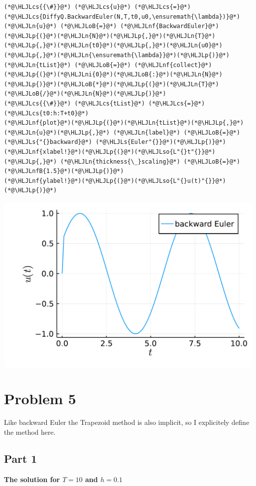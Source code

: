 \documentclass[12pt,a4paper]{article}
\newcommand{\HLJLn}[1]{#1}
\newcommand{\HLJLnf}[1]{\textcolor[RGB]{66,102,213}{#1}}
\newcommand{\HLJLs}[1]{\textcolor[RGB]{201,61,57}{#1}}
\newcommand{\HLJLso}[1]{\textcolor[RGB]{201,61,57}{#1}}
\newcommand{\HLJLnfB}[1]{\textcolor[RGB]{59,151,46}{#1}}
\newcommand{\HLJLni}[1]{\textcolor[RGB]{59,151,46}{#1}}
\newcommand{\HLJLoB}[1]{\textcolor[RGB]{102,102,102}{\textbf{#1}}}
\newcommand{\HLJLp}[1]{#1}
\newcommand{\HLJLcs}[1]{\textcolor[RGB]{153,153,119}{\textit{#1}}}
\begin{document}
\begin{lstlisting}
(*@\HLJLcs{{\#}}@*) (*@\HLJLcs{u}@*) (*@\HLJLcs{=}@*) (*@\HLJLcs{DiffyQ.BackwardEuler(N,T,t0,u0,\ensuremath{\lambda})}@*)
(*@\HLJLn{u}@*) (*@\HLJLoB{=}@*) (*@\HLJLnf{BackwardEuler}@*)(*@\HLJLp{(}@*)(*@\HLJLn{N}@*)(*@\HLJLp{,}@*)(*@\HLJLn{T}@*)(*@\HLJLp{,}@*)(*@\HLJLn{t0}@*)(*@\HLJLp{,}@*)(*@\HLJLn{u0}@*)(*@\HLJLp{,}@*)(*@\HLJLn{\ensuremath{\lambda}}@*)(*@\HLJLp{)}@*)
(*@\HLJLn{tList}@*) (*@\HLJLoB{=}@*) (*@\HLJLnf{collect}@*)(*@\HLJLp{(}@*)(*@\HLJLni{0}@*)(*@\HLJLoB{:}@*)(*@\HLJLn{N}@*)(*@\HLJLp{)}@*)(*@\HLJLoB{*}@*)(*@\HLJLp{(}@*)(*@\HLJLn{T}@*)(*@\HLJLoB{/}@*)(*@\HLJLn{N}@*)(*@\HLJLp{)}@*)
(*@\HLJLcs{{\#}}@*) (*@\HLJLcs{tList}@*) (*@\HLJLcs{=}@*) (*@\HLJLcs{t0:h:T+t0}@*)
(*@\HLJLnf{plot}@*)(*@\HLJLp{(}@*)(*@\HLJLn{tList}@*)(*@\HLJLp{,}@*) (*@\HLJLn{u}@*)(*@\HLJLp{,}@*) (*@\HLJLn{label}@*) (*@\HLJLoB{=}@*) (*@\HLJLs{"{}backward}@*) (*@\HLJLs{Euler"{}}@*)(*@\HLJLp{)}@*)
(*@\HLJLnf{xlabel!}@*)(*@\HLJLp{(}@*)(*@\HLJLso{L"{}t"{}}@*)(*@\HLJLp{,}@*) (*@\HLJLn{thickness{\_}scaling}@*) (*@\HLJLoB{=}@*) (*@\HLJLnfB{1.5}@*)(*@\HLJLp{)}@*)
(*@\HLJLnf{ylabel!}@*)(*@\HLJLp{(}@*)(*@\HLJLso{L"{}u(t)"{}}@*)(*@\HLJLp{)}@*)
\end{lstlisting}

\includegraphics[width=\linewidth]{figures/ass_1_report_8_1.pdf}

\section{Problem 5}
Like backward Euler the Trapezoid method is also implicit, so I explicitely define the method here.

\subsection{Part 1}
\textbf{The solution for $T=10$ and $h=0.1$}
\end{document}
